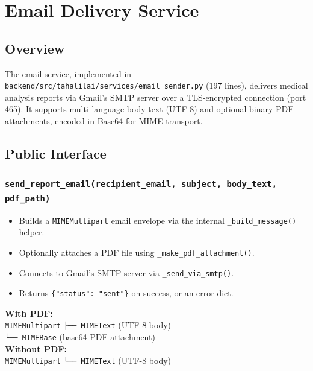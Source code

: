 \documentclass[12pt, a4paper]{article}
\newcommand{\file}[1]{\texttt{\color{accent}#1}}
\newcommand{\func}[1]{\texttt{\color{danger}#1}}
\begin{document}
\section{Email Delivery Service}

\subsection{Overview}

The email service, implemented in
\file{backend/src/tahalilai/services/email\_sender.py} (197 lines), delivers
medical analysis reports via Gmail's SMTP server over a TLS-encrypted connection
(port 465). It supports multi-language body text (UTF-8) and optional binary
PDF attachments, encoded in Base64 for MIME transport.

\subsection{Public Interface}

\subsubsection{\func{send\_report\_email(recipient\_email, subject, body\_text, pdf\_path)}}

\begin{itemize}[leftmargin=*, itemsep=3pt]
  \item Builds a \texttt{MIMEMultipart} email envelope via the internal
        \func{\_build\_message()} helper.
  \item Optionally attaches a PDF file using \func{\_make\_pdf\_attachment()}.
  \item Connects to Gmail's SMTP server via \func{\_send\_via\_smtp()}.
  \item Returns \texttt{\{"status": "sent"\}} on success, or an error dict.
\end{itemize}

\begin{infobox}[title={MIME Structure}]
  \textbf{With PDF:}\\
  \texttt{MIMEMultipart} \quad\texttt{├── MIMEText} (UTF-8 body)\\
  \hspace*{5.25cm}\texttt{└── MIMEBase} (base64 PDF attachment)\\[6pt]
  \textbf{Without PDF:}\\
  \texttt{MIMEMultipart} \quad\texttt{└── MIMEText} (UTF-8 body)
\end{infobox}
\end{document}
